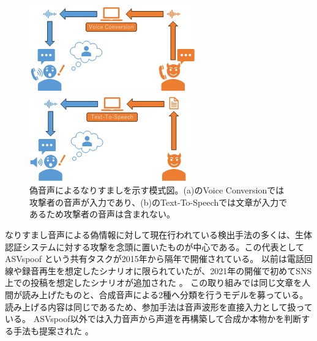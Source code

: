 \begin{figure}[p]
\centering
  \begin{minipage}[b]{0.8\linewidth}
    \centering
    \includegraphics[keepaspectratio, width=0.8\linewidth]{figures/vc.png}
  \end{minipage}
  \begin{minipage}[b]{0.8\linewidth}
    \centering
    \includegraphics[keepaspectratio, width=0.8\linewidth]{figures/tts.png}
  \end{minipage}
  \caption{偽音声によるなりすましを示す模式図。(a)のVoice Conversionでは攻撃者の音声が入力であり、(b)のText-To-Speechでは文章が入力であるため攻撃者の音声は含まれない。}
  \label{fig:vctts}
\end{figure}

なりすまし音声による偽情報に対して現在行われている検出手法の多くは、生体認証システムに対する攻撃を念頭に置いたものが中心である。この代表としてASVspoof \cite{7858696,kinnunen17_interspeech,todisco19_interspeech}という共有タスクが2015年から隔年で開催されている。
以前は電話回線や録音再生を想定したシナリオに限られていたが、2021年の開催で初めてSNS上での投稿を想定したシナリオが追加された \cite{yamagishi21_asvspoof}。
この取り組みでは同じ文章を人間が読み上げたものと、合成音声による2種へ分類を行うモデルを募っている。
読み上げる内容は同じであるため、参加手法は音声波形を直接入力として扱っている\cite{jung20c_interspeech,9746213}。
ASVspoof以外では入力音声から声道を再構築して合成か本物かを判断する手法も提案された \cite{280020}。

